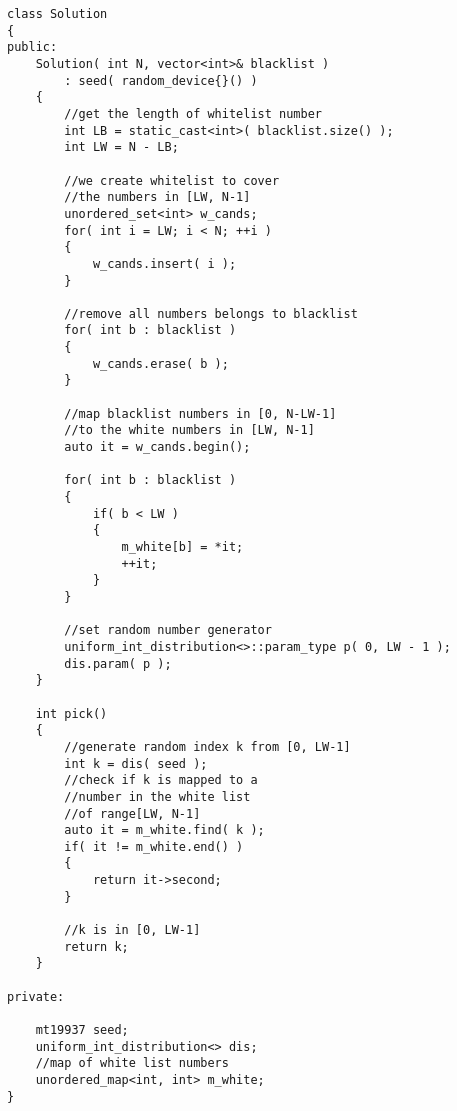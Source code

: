 \begin{lstlisting}[style=customc, caption={Re-map}]
class Solution
{
public:
    Solution( int N, vector<int>& blacklist )
        : seed( random_device{}() )
    {
        //get the length of whitelist number
        int LB = static_cast<int>( blacklist.size() );
        int LW = N - LB;

        //we create whitelist to cover
        //the numbers in [LW, N-1]
        unordered_set<int> w_cands;
        for( int i = LW; i < N; ++i )
        {
            w_cands.insert( i );
        }

        //remove all numbers belongs to blacklist
        for( int b : blacklist )
        {
            w_cands.erase( b );
        }

        //map blacklist numbers in [0, N-LW-1]
        //to the white numbers in [LW, N-1]
        auto it = w_cands.begin();

        for( int b : blacklist )
        {
            if( b < LW )
            {
                m_white[b] = *it;
                ++it;
            }
        }

        //set random number generator
        uniform_int_distribution<>::param_type p( 0, LW - 1 );
        dis.param( p );
    }

    int pick()
    {
        //generate random index k from [0, LW-1]
        int k = dis( seed );
        //check if k is mapped to a
        //number in the white list
        //of range[LW, N-1]
        auto it = m_white.find( k );
        if( it != m_white.end() )
        {
            return it->second;
        }

        //k is in [0, LW-1]
        return k;
    }

private:

    mt19937 seed;
    uniform_int_distribution<> dis;
    //map of white list numbers
    unordered_map<int, int> m_white;
}
\end{lstlisting}